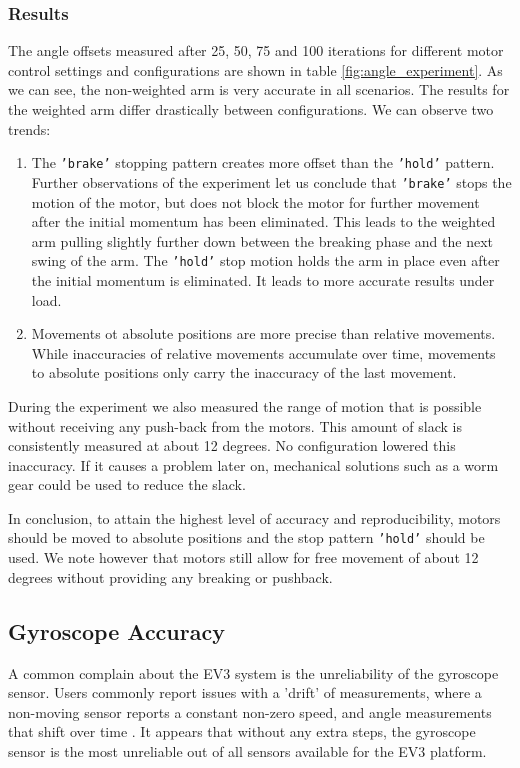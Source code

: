 \documentclass[11pt, a4paper]{article}
\begin{document}
\subsubsection*{Results}
The angle offsets measured after 25, 50, 75 and 100 iterations for different motor control settings and configurations are shown in table \ref{fig:angle_experiment}. As we can see, the non-weighted arm is very accurate in all scenarios. The results for the weighted arm differ drastically between configurations. We can observe two trends:
\begin{enumerate}
	\item The \texttt{'brake'} stopping pattern creates more offset than the \texttt{'hold'} pattern. Further observations of the experiment let us conclude that \texttt{'brake'} stops the motion of the motor, but does not block the motor for further movement after the initial momentum has been eliminated. This leads to the weighted arm pulling slightly further down between the breaking phase and the next swing of the arm. The \texttt{'hold'} stop motion holds the arm in place even after the initial momentum is eliminated. It leads to more accurate results under load.
	\item Movements ot absolute positions are more precise than relative movements. While inaccuracies of relative movements accumulate over time, movements to absolute positions only carry the inaccuracy of the last movement.
\end{enumerate}
During the experiment we also measured the range of motion that is possible without receiving any push-back from the motors. This amount of slack is consistently measured at about 12 degrees. No configuration lowered this inaccuracy. If it causes a problem later on, mechanical solutions such as a worm gear could be used to reduce the slack.

\bigskip
In conclusion, to attain the highest level of accuracy and reproducibility, motors should be moved to absolute positions and the stop pattern \texttt{'hold'} should be used. We note however that motors still allow for free movement of about 12 degrees without providing any breaking or pushback.

\subsection{Gyroscope Accuracy}
A common complain about the EV3 system is the unreliability of the gyroscope sensor. Users commonly report issues with a 'drift' of measurements, where a non-moving sensor reports a constant non-zero speed, and angle measurements that shift over time \cite{gyro_inaccurate}. It appears that without any extra steps, the gyroscope sensor is the most unreliable out of all sensors available for the EV3 platform.
\end{document}
